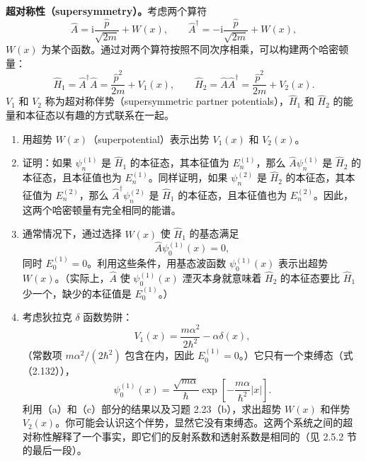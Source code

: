 \textbf{超对称性（supersymmetry）。}考虑两个算符
\[
\hat A=\mathrm{i}\frac{\hat p}{\sqrt{2m}}+W(x),\qquad
\hat A^\dagger=-\mathrm{i}\frac{\hat p}{\sqrt{2m}}+W(x),
\]
$W(x)$ 为某个函数。通过对两个算符按照不同次序相乘，可以构建两个哈密顿量：
\[
\hat H_1=\hat A^\dagger\hat A=\frac{\hat p^2}{2m}+V_1(x),\qquad
\hat H_2=\hat A\hat A^\dagger=\frac{\hat p^2}{2m}+V_2(x).
\]
$V_1$ 和 $V_2$ 称为超对称伴势（supersymmetric partner potentials），$\hat H_1$ 和 $\hat H_2$ 的能量和本征态以有趣的方式联系在一起。
\begin{enumerate}
\item 用超势 $W(x)$（superpotential）表示出势 $V_1(x)$ 和 $V_2(x)$。
\item 证明：如果 $\psi_n^{(1)}$ 是 $\hat H_1$ 的本征态，其本征值为 $E_n^{(1)}$，那么 $\hat A\psi_n^{(1)}$ 是 $\hat H_2$ 的本征态，且本征值也为 $E_n^{(1)}$。同样证明，如果 $\psi_n^{(2)}$ 是 $\hat H_2$ 的本征态，其本征值为 $E_n^{(2)}$，那么 $\hat A^\dagger\psi_n^{(2)}$ 是 $\hat H_1$ 的本征态，且本征值也为 $E_n^{(2)}$。因此，这两个哈密顿量有完全相同的能谱。
\item 通常情况下，通过选择 $W(x)$ 使 $\hat H_1$ 的基态满足
\[
\hat A\psi_0^{(1)}(x)=0,
\]
同时 $E_0^{(1)}=0$。利用这些条件，用基态波函数 $\psi_0^{(1)}(x)$ 表示出超势 $W(x)$。（实际上，$\hat A$ 使 $\psi_0^{(1)}(x)$ 湮灭本身就意味着 $\hat H_2$ 的本征态要比 $\hat H_1$ 少一个，缺少的本征值是 $E_0^{(1)}$。）
\item 考虑狄拉克 $\delta$ 函数势阱：
\[
V_1(x)=\frac{m\alpha^2}{2\hbar^2}-\alpha\delta(x),
\]
（常数项 $m\alpha^2/(2\hbar^2)$ 包含在内，因此 $E_0^{(1)}=0$。）它只有一个束缚态（式（2.132）），
\[
\psi_0^{(1)}(x)=\frac{\sqrt{m\alpha}}{\hbar}
\exp\left[-\frac{m\alpha}{\hbar^2}|x|\right].
\]
利用（a）和（c）部分的结果以及习题 2.23（b），求出超势 $W(x)$ 和伴势 $V_2(x)$。你可能会认识这个伴势，显然它没有束缚态。这两个系统之间的超对称性解释了一个事实，即它们的反射系数和透射系数是相同的（见 2.5.2 节的最后一段）。
\end{enumerate}
\vfill

